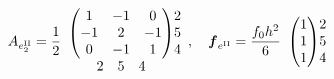 \[A_{e_2^{\mathrm {II}}}=\frac12\begin{array}{c@{}c}
\begin{pmatrix}1&-1&0\\-1&2&-1\\0&-1&1\end{pmatrix}&\begin{matrix}2\\5\\4\end{matrix}\\
\begin{matrix}2&5&4\end{matrix}&\end{array},\quad
\boldsymbol{f}_{e^{\mathrm {II}}}=\frac{f_0h^2}{6}\begin{array}{c@{}c}\begin{pmatrix}1\\1\\1\end{pmatrix}&\begin{matrix}2\\5\\4\end{matrix}\end{array}\]
